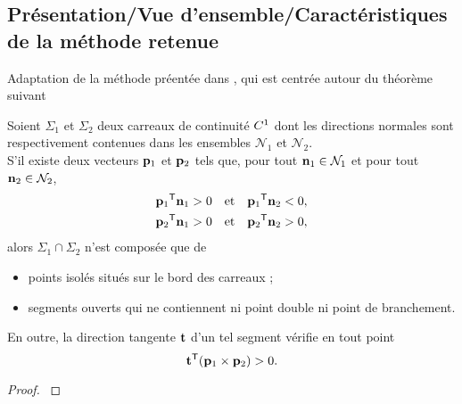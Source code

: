 \subsection{Présentation/Vue d'ensemble/Caractéristiques de la méthode retenue}
Adaptation de la méthode préentée dans \cite{hohmeyer1992}, qui est centrée autour du théorème suivant

\begin{theoreme}[Hohmeyer]
	\label{theo:detection_boucles_hohmeyer}
	Soient $\Sigma_1$ et $\Sigma_2$ deux carreaux de continuité $C^{1}$ dont les directions normales sont respectivement contenues dans les ensembles $\mathcal{N}_1$ et $\mathcal{N}_2$. \\
	S'il existe deux vecteurs $\mathbf{p}_1$ et $\mathbf{p}_2$ tels que, 
	pour tout $\mathbf{n}_1 \in \mathcal{N}_1$ et pour tout $\mathbf{n}_2 \in \mathcal{N}_2$,
	\begin{align}
		{ \mathbf{p}_1 } ^\mathsf{T} { \mathbf{n}_1 } > 0 &\text{\quad et\quad} { \mathbf{p}_1 } ^\mathsf{T} { \mathbf{n}_2 } < 0, \label{eq:hohmeyer_separation}\\
		{ \mathbf{p}_2 } ^\mathsf{T} { \mathbf{n}_1 } > 0 &\text{\quad et\quad} { \mathbf{p}_2 } ^\mathsf{T} { \mathbf{n}_2 } > 0, \label{eq:hohmeyer_hemisphere}
	\end{align}
	alors $\Sigma_1 \cap \Sigma_2$ n'est composée que de 
	\begin{itemize}
		\item points isolés situés sur le bord des carreaux ;
		\item segments ouverts qui ne contiennent ni point double ni point de branchement.
	\end{itemize}
	En outre, la direction tangente $\mathbf{t}$ d'un tel segment vérifie en tout point
	\begin{equation}
		{ \mathbf{t}} ^\mathsf{T} { ({ \mathbf{p}_1 } \times { \mathbf{p}_2 }) } > 0. \label{eq:hohmeyer_monotone}
	\end{equation}
\end{theoreme}


\begin{proof}
	\cf \cite[Théorème~4]{hohmeyer1992}
\end{proof}


